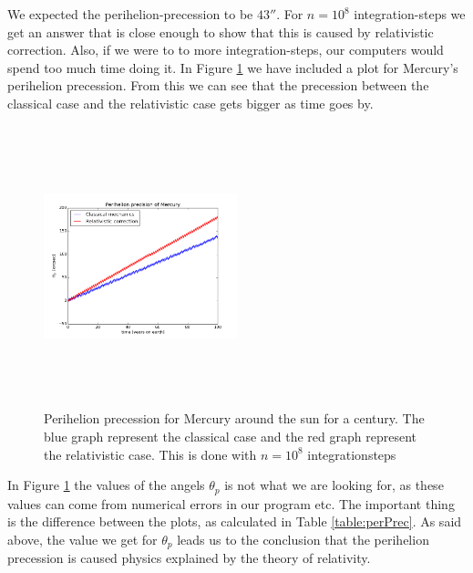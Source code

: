 \documentclass[%
 reprint,
 nobalance,
 amsmath,amssymb,
 aps,
]{revtex4-1}
\begin{document}
We expected the perihelion-precession to be $43''$. For $n=10^8$ integration-steps we get an answer that is close enough to show that this is caused by relativistic correction. Also, if we were to to more integration-steps, our computers would spend too much time doing it.
 In Figure \ref{fig:mercury_perPrec} we have included a plot for Mercury's perihelion precession. From this we can see that the precession between the classical case and the relativistic case gets bigger as time goes by.

\begin{figure}[H]
\centering
\includegraphics[height=3.2in, width=0.5\textwidth]{plot/perihelion_precision.png} \caption{Perihelion precession for Mercury around the sun for a century. The blue graph represent the classical case and the red graph represent the relativistic case. This is done with $n=10^8$ integrationsteps}\label{fig:mercury_perPrec}
\end{figure}

In Figure \ref{fig:mercury_perPrec} the values of the angels $\theta_p$ is not what we are looking for, as these values can come from numerical errors in our program etc. The important thing is the difference between the plots, as calculated in Table \ref{table:perPrec}. As said above, the value we get for $\theta_p$ leads us to the conclusion that the perihelion precession is caused physics explained by the theory of relativity.
\end{document}
